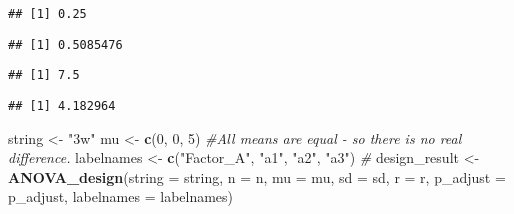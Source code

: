 \documentclass[]{article}
\newenvironment{Shaded}{\begin{snugshade}}{\end{snugshade}}
\newcommand{\KeywordTok}[1]{\textcolor[rgb]{0.13,0.29,0.53}{\textbf{#1}}}
\newcommand{\DataTypeTok}[1]{\textcolor[rgb]{0.13,0.29,0.53}{#1}}
\newcommand{\DecValTok}[1]{\textcolor[rgb]{0.00,0.00,0.81}{#1}}
\newcommand{\StringTok}[1]{\textcolor[rgb]{0.31,0.60,0.02}{#1}}
\newcommand{\CommentTok}[1]{\textcolor[rgb]{0.56,0.35,0.01}{\textit{#1}}}
\newcommand{\OperatorTok}[1]{\textcolor[rgb]{0.81,0.36,0.00}{\textbf{#1}}}
\newcommand{\NormalTok}[1]{#1}
\begin{document}
\begin{verbatim}
## [1] 0.25
\end{verbatim}

\begin{Shaded}
\end{Shaded}

\begin{verbatim}
## [1] 0.5085476
\end{verbatim}

\begin{Shaded}
\end{Shaded}

\begin{verbatim}
## [1] 7.5
\end{verbatim}

\begin{Shaded}
\end{Shaded}

\begin{verbatim}
## [1] 4.182964
\end{verbatim}

\begin{Shaded}
\begin{Highlighting}[]
\NormalTok{string <-}\StringTok{ "3w"}
\NormalTok{mu <-}\StringTok{ }\KeywordTok{c}\NormalTok{(}\DecValTok{0}\NormalTok{, }\DecValTok{0}\NormalTok{, }\DecValTok{5}\NormalTok{) }\CommentTok{#All means are equal - so there is no real difference.}
\NormalTok{labelnames <-}\StringTok{ }\KeywordTok{c}\NormalTok{(}\StringTok{"Factor_A"}\NormalTok{, }\StringTok{"a1"}\NormalTok{, }\StringTok{"a2"}\NormalTok{, }\StringTok{"a3"}\NormalTok{) }\CommentTok{#}
\NormalTok{design_result <-}\StringTok{ }\KeywordTok{ANOVA_design}\NormalTok{(}\DataTypeTok{string =}\NormalTok{ string, }\DataTypeTok{n =}\NormalTok{ n, }\DataTypeTok{mu =}\NormalTok{ mu, }\DataTypeTok{sd =}\NormalTok{ sd, }\DataTypeTok{r =}\NormalTok{ r, }
                   \DataTypeTok{p_adjust =}\NormalTok{ p_adjust, }\DataTypeTok{labelnames =}\NormalTok{ labelnames)}
\end{Highlighting}
\end{Shaded}
\end{document}
